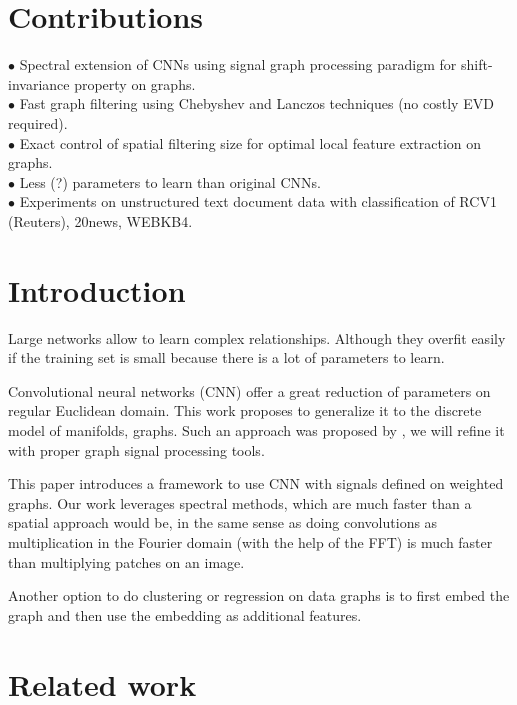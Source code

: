 \documentclass{article}
\begin{document}
\section{Contributions}
$\bullet$ Spectral extension of CNNs using signal graph processing paradigm \cite{shuman_emerging_2013} for shift-invariance property on graphs.\\
$\bullet$ Fast graph filtering using Chebyshev and Lanczos techniques (no costly EVD required).\\
$\bullet$ Exact control of spatial filtering size for optimal local feature extraction on graphs.\\
$\bullet$ Less (?) parameters to learn than original CNNs.\\
$\bullet$ Experiments on unstructured text document data with classification of RCV1 (Reuters), 20news, WEBKB4.\\






\section{Introduction}\label{introduction}

Large networks allow to learn complex relationships. Although they
overfit easily if the training set is small because there is a lot of
parameters to learn.

Convolutional neural networks (CNN) offer a great reduction of
parameters on regular Euclidean domain. This work proposes to generalize
it to the discrete model of manifolds, graphs. Such an approach was
proposed by \citep{bruna_spectral_2013, henaff_deep_2015}, we will
refine it with proper graph signal processing tools.

This paper introduces a framework to use CNN with signals defined on
weighted graphs. Our work leverages spectral methods, which are much
faster than a spatial approach would be, in the same sense as doing
convolutions as multiplication in the Fourier domain (with the help of
the FFT) is much faster than multiplying patches on an image.

Another option to do clustering or regression on data graphs is to first
embed the graph and then use the embedding as additional features.

\section{Related work}\label{related-work}
\end{document}
